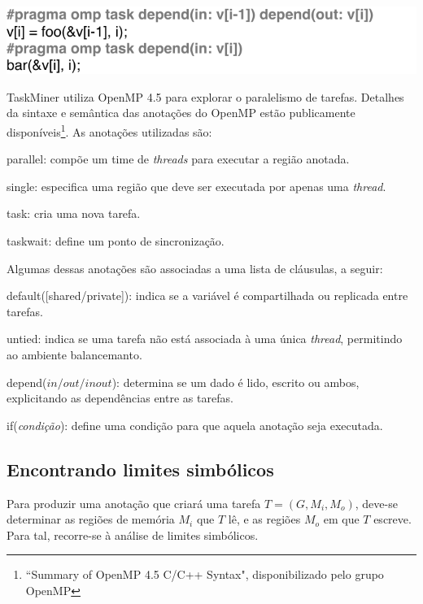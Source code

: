 \documentclass[sigplan,10pt]{acmart}
\newcommand\Taskminer{\mbox{\textsf{TaskMiner}}}
\begin{document}
\includegraphics[width=1\columnwidth]{images/ex_depends}

{\Taskminer} utiliza OpenMP 4.5 para explorar o paralelismo de tarefas. Detalhes da sintaxe e semântica
das anotações do OpenMP estão publicamente disponíveis\footnote{``Summary of OpenMP 4.5 C/C++ Syntax", disponibilizado
pelo grupo OpenMP}. As anotações utilizadas são:
%
\begin{compactitem}
\item \textsf{parallel}: compõe um time de \textit{threads}
para executar a região anotada.
\item \textsf{single}: especifica uma região que deve ser executada
por apenas uma \textit{thread}.
\item \textsf{task}: cria uma nova tarefa.
\item \textsf{taskwait}: define um ponto de sincronização.
\end{compactitem}
%
Algumas dessas anotações são associadas a uma lista de cláusulas, a seguir:
\begin{compactitem}
\item \textsf{default([shared/private])}: indica se a variável é compartilhada ou replicada
entre tarefas.
\item \textsf{untied}: indica se uma tarefa não está associada à uma única \textit{thread},
permitindo ao ambiente balancemanto.
\item \textsf{depend}($\mathit{in}/\mathit{out}/\mathit{inout}$): determina se um dado é lido, escrito
ou ambos, explicitando as dependências entre as tarefas.
\item \textsf{if}({\em condição}): define uma condição para que aquela anotação seja executada.
\end{compactitem}

\subsection{Encontrando limites simbólicos}
\label{sec:sra}

Para produzir uma anotação que criará uma tarefa $T = (G, M_i, M_o)$,
deve-se determinar as regiões de memória $M_i$ que $T$ lê, e as regiões
$M_o$ em que $T$ escreve. Para tal, recorre-se à análise de limites simbólicos.
 
\end{document}
